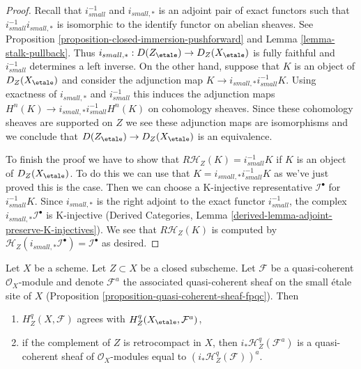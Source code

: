 \begin{proof}
Recall that $i_{small}^{-1}$ and $i_{small, *}$ is an adjoint pair of
exact functors such that $i_{small}^{-1}i_{small, *}$ is isomorphic to
the identify functor on abelian sheaves. See
Proposition \ref{proposition-closed-immersion-pushforward} and
Lemma \ref{lemma-stalk-pullback}. Thus
$i_{small, *} : D(Z_\etale) \to D_Z(X_\etale)$ is fully faithful and
$i_{small}^{-1}$ determines
a left inverse. On the other hand, suppose that $K$ is an object of
$D_Z(X_\etale)$ and consider the adjunction map
$K \to i_{small, *}i_{small}^{-1}K$.
Using exactness of $i_{small, *}$ and $i_{small}^{-1}$
this induces the adjunction maps
$H^n(K) \to i_{small, *}i_{small}^{-1}H^n(K)$ on cohomology sheaves.
Since these cohomology
sheaves are supported on $Z$ we see these adjunction maps are isomorphisms
and we conclude that $D(Z_\etale) \to D_Z(X_\etale)$ is an equivalence.

\medskip\noindent
To finish the proof we have to show that $R\mathcal{H}_Z(K) = i_{small}^{-1}K$
if $K$ is an object of $D_Z(X_\etale)$. To do this we can use that
$K = i_{small, *}i_{small}^{-1}K$
as we've just proved this is the case. Then we
can choose a K-injective representative $\mathcal{I}^\bullet$ for
$i_{small}^{-1}K$.
Since $i_{small, *}$ is the right adjoint to the exact functor
$i_{small}^{-1}$, the
complex $i_{small, *}\mathcal{I}^\bullet$ is K-injective
(Derived Categories, Lemma \ref{derived-lemma-adjoint-preserve-K-injectives}).
We see that $R\mathcal{H}_Z(K)$ is computed by
$\mathcal{H}_Z(i_{small, *}\mathcal{I}^\bullet) = \mathcal{I}^\bullet$
as desired.
\end{proof}

\begin{lemma}
\label{lemma-cohomology-with-support-quasi-coherent}
Let $X$ be a scheme. Let $Z \subset X$ be a closed subscheme.
Let $\mathcal{F}$ be a quasi-coherent $\mathcal{O}_X$-module
and denote $\mathcal{F}^a$ the associated quasi-coherent sheaf
on the small \'etale site of $X$
(Proposition \ref{proposition-quasi-coherent-sheaf-fpqc}). Then
\begin{enumerate}
\item $H^q_Z(X, \mathcal{F})$ agrees with $H^q_Z(X_\etale, \mathcal{F}^a)$,
\item if the complement of $Z$ is retrocompact in $X$, then
$i_*\mathcal{H}^q_Z(\mathcal{F}^a)$ is a quasi-coherent sheaf of
$\mathcal{O}_X$-modules equal to $(i_*\mathcal{H}^q_Z(\mathcal{F}))^a$.
\end{enumerate}
\end{lemma}


